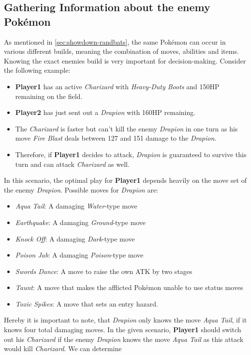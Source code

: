 \subsection{Gathering Information about the enemy Pokémon}
\label{sec:builds-randbats}
As mentioned in \ref{sec:showdown-randbats}, the same Pokémon can occur in various different builds, meaning the combination
of moves, abilities and items. Knowing the exact enemies build is very important for decision-making. Consider the following
example: 
\begin{itemize}
	\item \textbf{Player1} has an active \textit{Charizard} with \textit{Heavy-Duty Boots} and 150\ac{HP} remaining on the field.
	\item \textbf{Player2} has just sent out a \textit{Drapion} with 160\ac{HP} remaining.
	\item The \textit{Charizard} is faster but can't kill the enemy \textit{Drapion} in one turn as his move 
	\textit{Fire Blast} deals between 127 and 151 damage to the \textit{Drapion}. 
	\item Therefore, if \textbf{Player1} decides to attack, \textit{Drapion} is guaranteed to survive this turn
	and can attack \textit{Charizard} as well.
\end{itemize}
In this scenario, the optimal play for \textbf{Player1} depends heavily on the move set of the enemy \textit{Drapion}.
Possible moves for \textit{Drapion} are:
\begin{itemize}
	\item \textit{Aqua Tail}: A damaging \textit{Water}-type move
	\item \textit{Earthquake}: A damaging \textit{Ground}-type move
	\item \textit{Knock Off}: A damaging \textit{Dark}-type move
	\item \textit{Poison Jab}: A damaging \textit{Poison}-type move
	\item \textit{Swords Dance}: A move to raise the own \ac{ATK} by two stages
	\item \textit{Taunt}: A move that makes the afflicted Pokémon unable to use status moves
	\item \textit{Toxic Spikes}: A move that sets an entry hazard.
\end{itemize}
Hereby it is important to note, that \textit{Drapion} only knows the move \textit{Aqua Tail}, if it knows four total 
damaging moves. In the given scenario, \textbf{Player1} should switch out his \textit{Charizard} if the enemy
\textit{Drapion} knows the move \textit{Aqua Tail} as this attack would kill \textit{Charizard}. We can determine 
